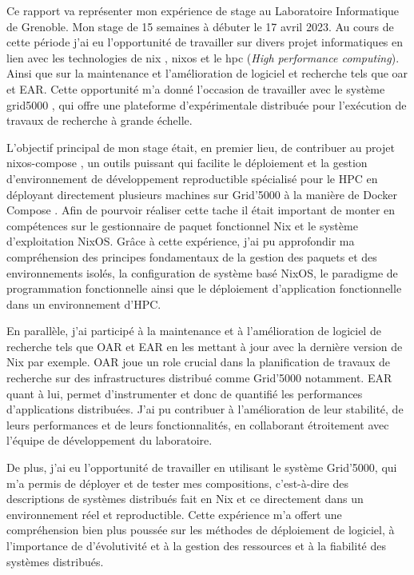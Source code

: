 \documentclass[a4paper,french,12pt, titlepage]{article}
\begin{document}
Ce rapport va représenter mon expérience de stage au Laboratoire
Informatique de Grenoble. Mon stage de 15 semaines à débuter le 17 avril
2023. Au cours de cette période j'ai eu l'opportunité de travailler sur
divers projet informatiques en lien avec les technologies de \Gls{nix}
\cite{nix2004}, \Gls{nixos} \cite{nixos2010} et le \Gls{hpc} (\emph{High
performance computing}). Ainsi que sur la maintenance et l'amélioration
de logiciel et recherche tels que \Gls{oar} \cite{oar2005} et EAR. Cette
opportunité m'a donné l'occasion de travailler avec le système
\Gls{grid5000} \cite{grid5000}, qui offre une plateforme d'expérimentale
distribuée pour l'exécution de travaux de recherche à grande
échelle.\newline

L'objectif principal de mon stage était, en premier lieu, de contribuer
au projet \Gls{nixos-compose} \cite{nixoscompose2022}, un outils
puissant qui facilite le déploiement et la gestion d'environnement de
développement reproductible spécialisé pour le HPC en déployant
directement plusieurs machines sur Grid'5000 à la manière de Docker
Compose \cite{docker2017}. Afin de pourvoir réaliser cette tache il
était important de monter en compétences sur le gestionnaire de paquet
fonctionnel Nix et le système d'exploitation NixOS. Grâce à cette
expérience, j'ai pu approfondir ma compréhension des principes
fondamentaux de la gestion des paquets et des environnements isolés, la
configuration de système basé NixOS, le paradigme de programmation
fonctionnelle ainsi que le déploiement d'application fonctionnelle dans
un environnement d'HPC.\newline

En parallèle, j'ai participé à la maintenance et à l'amélioration de
logiciel de recherche tels que OAR et EAR en les mettant à jour avec la
dernière version de Nix par exemple. OAR joue un role crucial dans la
planification de travaux de recherche sur des infrastructures distribué
comme Grid'5000 notamment. EAR quant à lui, permet d'instrumenter et
donc de quantifié les performances d'applications distribuées. J'ai pu
contribuer à l'amélioration de leur stabilité, de leurs performances et
de leurs fonctionnalités, en collaborant étroitement avec l'équipe de
développement du laboratoire.\newline

De plus, j'ai eu l'opportunité de travailler en utilisant le système
Grid'5000, qui m'a permis de déployer et de tester mes
\glspl{composition}, c'est-à-dire des descriptions de systèmes
distribués fait en Nix et ce directement dans un environnement réel et
reproductible. Cette expérience m'a offert une compréhension bien plus
poussée sur les méthodes de déploiement de logiciel, à l'importance de
d'évolutivité et à la gestion des ressources et à la fiabilité des
systèmes distribués.\newline
\end{document}
